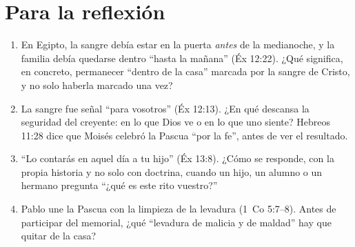 \documentclass[11pt,letterpaper]{article}
\begin{document}
\section{Para la reflexión}

\begin{enumerate}\setlength{\itemsep}{3pt}
\item En Egipto, la sangre debía estar en la puerta \emph{antes} de la medianoche, y la familia debía quedarse dentro ``hasta la mañana'' (Éx 12:22). ¿Qué significa, en concreto, permanecer ``dentro de la casa'' marcada por la sangre de Cristo, y no solo haberla marcado una vez?
\item La sangre fue señal ``para vosotros'' (Éx 12:13). ¿En qué descansa la seguridad del creyente: en lo que Dios ve o en lo que uno siente? Hebreos 11:28 dice que Moisés celebró la Pascua ``por la fe'', antes de ver el resultado.
\item ``Lo contarás en aquel día a tu hijo'' (Éx 13:8). ¿Cómo se responde, con la propia historia y no solo con doctrina, cuando un hijo, un alumno o un hermano pregunta ``¿qué es este rito vuestro?''
\item Pablo une la Pascua con la limpieza de la levadura (1~Co 5:7--8). Antes de participar del memorial, ¿qué ``levadura de malicia y de maldad'' hay que quitar de la casa?
\end{enumerate}

\end{document}
